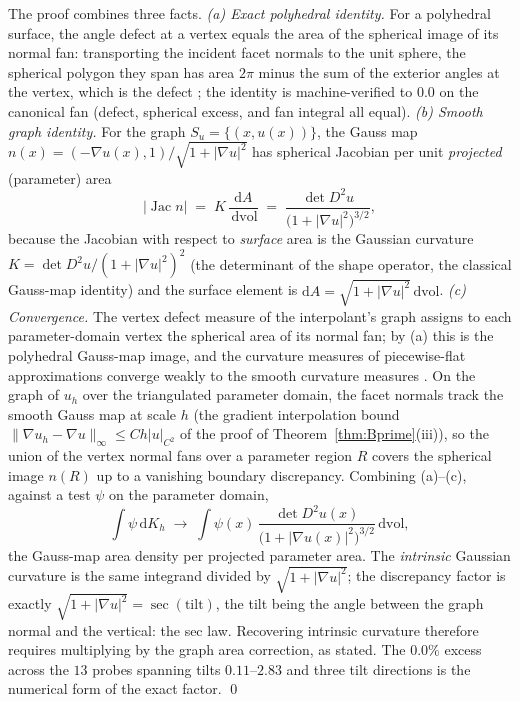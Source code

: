 \documentclass[11pt,a4paper]{article}
\theoremstyle{plain}
\theoremstyle{definition}
\theoremstyle{remark}
\newcommand{\dvol}{\,\mathrm{dvol}}
\begin{document}
The proof combines three facts. \emph{(a) Exact polyhedral identity.}
For a polyhedral surface, the angle defect at a vertex equals the
area of the spherical image of its normal fan: transporting the
incident facet normals to the unit sphere, the spherical polygon
they span has area $2\pi$ minus the sum of the exterior angles at
the vertex, which is the defect \citep{regge1961, cheeger1984}; the
identity is machine-verified to $0.0$ on the canonical fan (defect,
spherical excess, and fan integral all equal). \emph{(b) Smooth
graph identity.} For the graph $S_u = \{(x, u(x))\}$, the Gauss map
$n(x) = (-\nabla u(x), 1)/\sqrt{1 + |\nabla u|^{2}}$ has spherical
Jacobian per unit \emph{projected} (parameter) area
\[
\bigl|\operatorname{Jac} n\bigr| \;=\; K\,
\frac{\mathrm{d}A}{\dvol} \;=\;
\frac{\det D^{2}u}{\bigl(1 + |\nabla u|^{2}\bigr)^{3/2}},
\]
because the Jacobian with respect to \emph{surface} area is the
Gaussian curvature $K = \det D^{2}u/(1 + |\nabla u|^{2})^{2}$ (the
determinant of the shape operator, the classical Gauss-map identity)
and the surface element is $\mathrm{d}A = \sqrt{1+|\nabla
u|^{2}}\dvol$. \emph{(c) Convergence.} The vertex defect measure of
the interpolant's graph assigns to each parameter-domain vertex the
spherical area of its normal fan; by (a) this is the polyhedral
Gauss-map image, and the curvature measures of piecewise-flat
approximations converge weakly to the smooth curvature measures
\citep{cheeger1984}. On the graph of $u_h$ over the triangulated
parameter domain, the facet normals track the smooth Gauss map at
scale $h$ (the gradient interpolation bound
$\|\nabla u_h - \nabla u\|_\infty \le Ch|u|_{C^{2}}$ of the proof of
Theorem~\ref{thm:Bprime}(iii)), so the union of the vertex normal
fans over a parameter region $R$ covers the spherical image
$n(R)$ up to a vanishing boundary discrepancy. Combining (a)--(c),
against a test $\psi$ on the parameter domain,
\[
\int \psi \,\mathrm{d}K_h \;\to\; \int \psi(x)\,
\frac{\det D^{2}u(x)}{\bigl(1+|\nabla u(x)|^{2}\bigr)^{3/2}}
\dvol,
\]
the Gauss-map area density per projected parameter area. The
\emph{intrinsic} Gaussian curvature is the same integrand divided
by $\sqrt{1+|\nabla u|^{2}}$; the discrepancy factor is exactly
$\sqrt{1+|\nabla u|^{2}} = \sec(\mathrm{tilt})$, the tilt being the
angle between the graph normal and the vertical: the sec law.
Recovering intrinsic curvature therefore requires multiplying by the
graph area correction, as stated. The $0.0\%$ excess across the
$13$ probes spanning tilts $0.11$--$2.83$ and three tilt directions
is the numerical form of the exact factor. \qed
\end{document}
